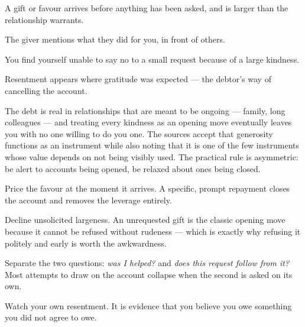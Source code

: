 \begin{feedback}
  \item A gift or favour arrives before anything has been asked, and is larger than the relationship warrants.
  \item The giver mentions what they did for you, in front of others.
  \item You find yourself unable to say no to a small request because of a large kindness.
  \item Resentment appears where gratitude was expected --- the debtor's way of cancelling the account.
\end{feedback}

\begin{failure}
The debt is real in relationships that are meant to be ongoing --- family, long colleagues --- and treating every kindness as an opening move eventually leaves you with no one willing to do you one. The sources accept that generosity functions as an instrument while also noting that it is one of the few instruments whose value depends on not being visibly used. The practical rule is asymmetric: be alert to accounts being opened, be relaxed about ones being closed.
\end{failure}

\begin{countermeasures}
  \item Price the favour at the moment it arrives. A specific, prompt repayment closes the account and removes the leverage entirely.
  \item Decline unsolicited largeness. An unrequested gift is the classic opening move because it cannot be refused without rudeness --- which is exactly why refusing it politely and early is worth the awkwardness.
  \item Separate the two questions: \emph{was I helped?} and \emph{does this request follow from it?} Most attempts to draw on the account collapse when the second is asked on its own.
  \item Watch your own resentment. It is evidence that you believe you owe something you did not agree to owe.
\end{countermeasures}

\seesources
{}
